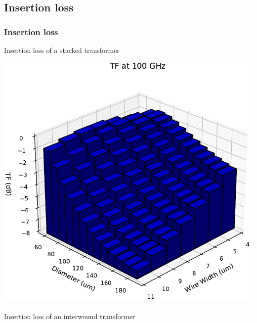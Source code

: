 \documentclass{sdkslides}
\begin{document}
\renewcommand{\sectionname}{Insertion loss}
\subsection*{\sectionname}
\begin{frame}[c]
    \frametitle{\sectionname}
    \begin{minipage}[t]{0.48\textwidth}
        \vskip 0pt
        \begin{block}{Insertion loss of a stacked transformer}
            \begin{center}
                \includegraphics[width=\textwidth]{./Pics/diff_S21_stacked_TF_3Dbar_diam_width_sweep_2.pdf}
            \end{center}
        \end{block}
    \end{minipage}\hfill
    \begin{minipage}[t]{0.48\textwidth}
        \vskip 0pt
        \begin{block}{Insertion loss of an interwound transformer}
            \begin{center}

\end{center}
\end{block}
\end{minipage}
\end{frame}
\end{document}

